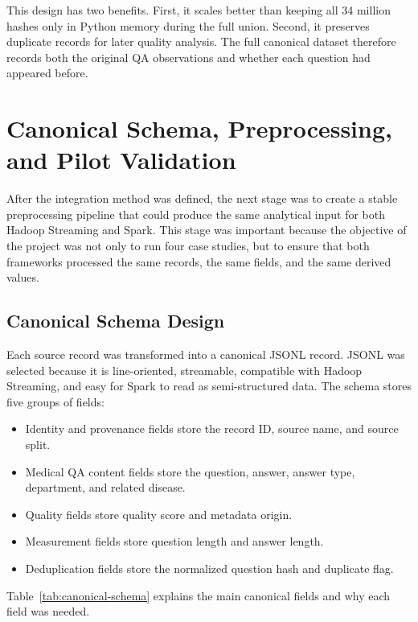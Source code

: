 \documentclass[12pt,a4paper]{article}
\let\oldsection\section
\renewcommand{\section}{\clearpage\oldsection}
\begin{document}
This design has two benefits. First, it scales better than keeping all 34 million hashes only in Python memory during the full union. Second, it preserves duplicate records for later quality analysis. The full canonical dataset therefore records both the original QA observations and whether each question had appeared before.

\section{Canonical Schema, Preprocessing, and Pilot Validation}

After the integration method was defined, the next stage was to create a stable preprocessing pipeline that could produce the same analytical input for both Hadoop Streaming and Spark. This stage was important because the objective of the project was not only to run four case studies, but to ensure that both frameworks processed the same records, the same fields, and the same derived values.

\subsection{Canonical Schema Design}

Each source record was transformed into a canonical JSONL record. JSONL was selected because it is line-oriented, streamable, compatible with Hadoop Streaming, and easy for Spark to read as semi-structured data. The schema stores five groups of fields:

\begin{itemize}
\item Identity and provenance fields store the record ID, source name, and source split.
\item Medical QA content fields store the question, answer, answer type, department, and related disease.
\item Quality fields store quality score and metadata origin.
\item Measurement fields store question length and answer length.
\item Deduplication fields store the normalized question hash and duplicate flag.
\end{itemize}

Table~\ref{tab:canonical-schema} explains the main canonical fields and why each field was needed.
\end{document}
